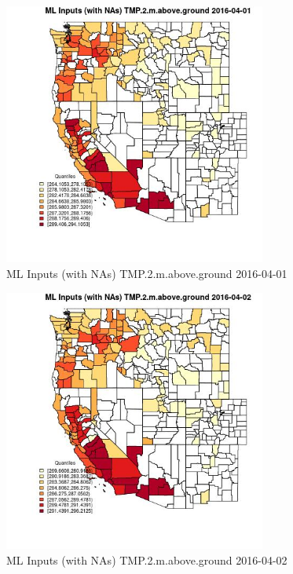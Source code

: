 \begin{figure} 
\centering  
\includegraphics[width=0.77\textwidth]{Code_Outputs/Report_ML_input_PM25_Step4_part_e_de_duplicated_aveswNAs_CountyTMP2mabovegroundMean2016-04-01_2016-04-01.jpg} 
\caption{\label{fig:Report_ML_input_PM25_Step4_part_e_de_duplicated_aveswNAsCountyTMP2mabovegroundMean2016-04-01_2016-04-01}ML Inputs (with NAs) TMP.2.m.above.ground 2016-04-01} 
\end{figure} 
 

\begin{figure} 
\centering  
\includegraphics[width=0.77\textwidth]{Code_Outputs/Report_ML_input_PM25_Step4_part_e_de_duplicated_aveswNAs_CountyTMP2mabovegroundMean2016-04-02_2016-04-02.jpg} 
\caption{\label{fig:Report_ML_input_PM25_Step4_part_e_de_duplicated_aveswNAsCountyTMP2mabovegroundMean2016-04-02_2016-04-02}ML Inputs (with NAs) TMP.2.m.above.ground 2016-04-02} 
\end{figure} 
 

